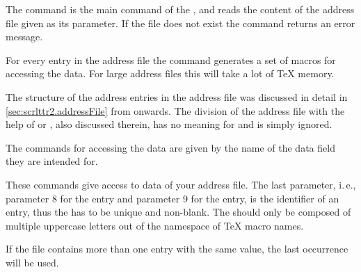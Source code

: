 \begin{Declaration}
\end{Declaration}%
The command  is the main command of the
, and reads the content of the address
file given as its parameter.  If the file does not
exist the command returns an error message.

For every entry in the address file the command generates a set of
macros for accessing the data. For large address files this will take
a lot of {\TeX} memory.

\begin{Declaration}%
\end{Declaration}%
The structure of the address entries in the address file was discussed
in detail in \autoref{sec:scrlttr2.addressFile} from
 onwards.  The division of
the address file with the help of  or ,
also discussed therein, has no meaning for  and is
simply ignored.

The commands for accessing the data are given by the name of the data
field they are intended for.

\begin{Declaration}
\end{Declaration}%
These commands give access to data of your address file.  The last
parameter, i.\,e., parameter 8 for the  entry and
parameter 9 for the  entry, is the identifier of an
entry, thus the  has to be unique and non-blank. The
 should only be composed of multiple uppercase letters out of the
namespace of \TeX{} macro names.

If the file contains more than one entry with the same 
value, the last occurrence will be used.%
%
\EndIndexGroup
%
\EndIndexGroup
%
\EndIndexGroup


